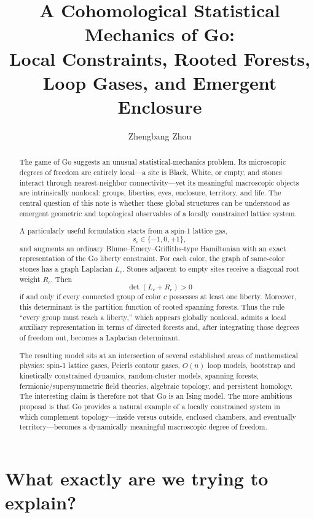 \documentclass[11pt]{article}
\title{A Cohomological Statistical Mechanics of Go:\\
Local Constraints, Rooted Forests, Loop Gases, and Emergent Enclosure}
\author{Zhengbang Zhou}
\date{}
\begin{document}
\maketitle

\begin{abstract}
The game of Go suggests an unusual statistical-mechanics problem. Its microscopic degrees of freedom are entirely local---a site is Black, White, or empty, and stones interact through nearest-neighbor connectivity---yet its meaningful macroscopic objects are intrinsically nonlocal: groups, liberties, eyes, enclosure, territory, and life. The central question of this note is whether these global structures can be understood as emergent geometric and topological observables of a locally constrained lattice system.

A particularly useful formulation starts from a spin-1 lattice gas,
\[
s_i\in\{-1,0,+1\},
\]
and augments an ordinary Blume--Emery--Griffiths-type Hamiltonian with an exact representation of the Go liberty constraint. For each color, the graph of same-color stones has a graph Laplacian \(L_c\). Stones adjacent to empty sites receive a diagonal root weight \(R_c\). Then
\[
\det(L_c+R_c)>0
\]
if and only if every connected group of color \(c\) possesses at least one liberty. Moreover, this determinant is the partition function of rooted spanning forests. Thus the rule ``every group must reach a liberty,'' which appears globally nonlocal, admits a local auxiliary representation in terms of directed forests and, after integrating those degrees of freedom out, becomes a Laplacian determinant.

The resulting model sits at an intersection of several established areas of mathematical physics: spin-1 lattice gases, Peierls contour gases, \(O(n)\) loop models, bootstrap and kinetically constrained dynamics, random-cluster models, spanning forests, fermionic/supersymmetric field theories, algebraic topology, and persistent homology. The interesting claim is therefore not that Go is an Ising model. The more ambitious proposal is that Go provides a natural example of a locally constrained system in which complement topology---inside versus outside, enclosed chambers, and eventually territory---becomes a dynamically meaningful macroscopic degree of freedom.
\end{abstract}

\section{What exactly are we trying to explain?}
\end{document}
